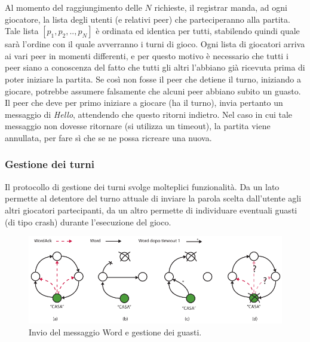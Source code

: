 \documentclass[10.5pt]{article}
\begin{document}
Al momento del raggiungimento delle $N$ richieste, il registrar manda, ad ogni giocatore, la lista degli utenti (e relativi peer) che parteciperanno alla partita. Tale lista $[p_1, p_2, .., p_N]$ è ordinata ed identica per tutti, stabilendo quindi quale sarà l'ordine con il quale avverranno i turni di gioco. Ogni lista di giocatori arriva ai vari peer in momenti differenti, e per questo motivo è necessario che tutti i peer siano a conoscenza del fatto che tutti gli altri l'abbiano già ricevuta prima di poter iniziare la partita. Se così non fosse il peer che detiene il turno, iniziando a giocare, potrebbe assumere falsamente che alcuni peer abbiano subito un guasto. Il peer che deve per primo iniziare a giocare (ha il turno), invia pertanto un messaggio di \textit{Hello}, attendendo che questo ritorni indietro. Nel caso in cui tale messaggio non dovesse ritornare (si utilizza un timeout), la partita viene annullata, per fare sì che se ne possa ricreare una nuova. 



\subsubsection{Gestione dei turni}

Il protocollo di gestione dei turni svolge molteplici funzionalità. Da un lato permette al detentore del turno attuale di inviare la parola scelta dall'utente agli altri giocatori partecipanti, da un altro permette di individuare eventuali guasti (di tipo crash) durante l'esecuzione del gioco.

\begin{figure}
\centering
\includegraphics[scale=0.9]{imgs/Esempi.pdf}
\caption{Invio del messaggio Word e gestione dei guasti.}
\label{img:word}
\end{figure}
\end{document}
